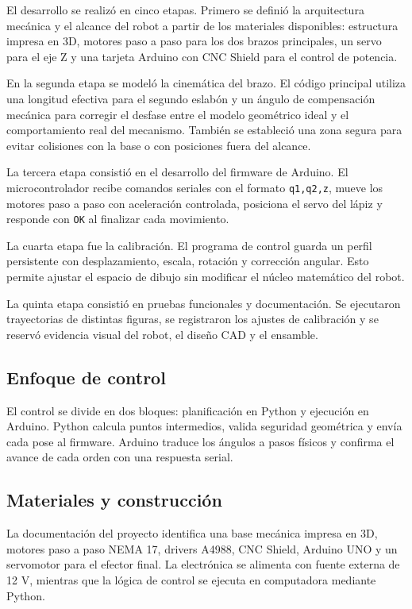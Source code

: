 \documentclass[11pt,letterpaper,onecolumn]{article}
\begin{document}
El desarrollo se realizó en cinco etapas. Primero se definió la arquitectura mecánica y el alcance del robot a partir de los materiales disponibles: estructura impresa en 3D, motores paso a paso para los dos brazos principales, un servo para el eje Z y una tarjeta Arduino con CNC Shield para el control de potencia.

En la segunda etapa se modeló la cinemática del brazo. El código principal utiliza una longitud efectiva para el segundo eslabón y un ángulo de compensación mecánica para corregir el desfase entre el modelo geométrico ideal y el comportamiento real del mecanismo. También se estableció una zona segura para evitar colisiones con la base o con posiciones fuera del alcance.

La tercera etapa consistió en el desarrollo del firmware de Arduino. El microcontrolador recibe comandos seriales con el formato \texttt{q1,q2,z}, mueve los motores paso a paso con aceleración controlada, posiciona el servo del lápiz y responde con \texttt{OK} al finalizar cada movimiento.

La cuarta etapa fue la calibración. El programa de control guarda un perfil persistente con desplazamiento, escala, rotación y corrección angular. Esto permite ajustar el espacio de dibujo sin modificar el núcleo matemático del robot.

La quinta etapa consistió en pruebas funcionales y documentación. Se ejecutaron trayectorias de distintas figuras, se registraron los ajustes de calibración y se reservó evidencia visual del robot, el diseño CAD y el ensamble.

\subsection{Enfoque de control}

El control se divide en dos bloques: planificación en Python y ejecución en Arduino. Python calcula puntos intermedios, valida seguridad geométrica y envía cada pose al firmware. Arduino traduce los ángulos a pasos físicos y confirma el avance de cada orden con una respuesta serial.

\subsection{Materiales y construcción}

La documentación del proyecto identifica una base mecánica impresa en 3D, motores paso a paso NEMA 17, drivers A4988, CNC Shield, Arduino UNO y un servomotor para el efector final. La electrónica se alimenta con fuente externa de 12 V, mientras que la lógica de control se ejecuta en computadora mediante Python.
 
\end{document}
